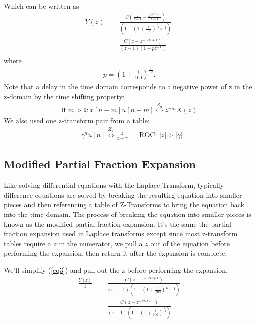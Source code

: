 \documentclass[letterpaper]{article}
\begin{document}
Which can be written as
\begin{align}
	Y(z) &=  \frac{C \left(\frac{z}{z-1} - \frac{z^{-12D+1}}{z-1} \right)}{\left(1 - \left(1 + \frac{i}{100} \right)^{\frac{1}{12}}z^{-1}\right)}. \label{eq3} \\
	     &=  \frac{C \left(z - z^{-12D+1} \right)}
	{\left(z-1\right)\left(1 - p z^{-1}\right)} \\
\end{align}
where 
\begin{align}
	p = \left(1 + \frac{i}{100} \right)^{\frac{1}{12}}.
\end{align}
Note that a delay in the time domain corresponds to a negative power of z in the z-domain by the time shifting property:
\begin{align}
	\text{If }m>0: x[n-m]u[n-m] \stackrel{Z_u}{\Longleftrightarrow} z^{-m} X(z)
\end{align}
We also used one z-transform pair from a table:
\begin{align}
	&\gamma^nu[n] \stackrel{Z_u}{\Longleftrightarrow} \frac{z}{z-\gamma} & &\text{ROC: } |z|>|\gamma|
\end{align}

\subsection{Modified Partial Fraction Expansion}
Like solving differential equations with the Laplace Transform, typically difference equations are solved by breaking the resulting equation into smaller pieces and then referencing a table of Z-Transforms to bring the equation back into the time domain. The process of breaking the equation into smaller pieces is known as the modified partial fraction expansion. It's the same the partial fraction expansion used in Laplace transforms except since most z-transform tables require a $z$ in the numerator, we pull a $z$ out of the equation before performing the expansion, then return it after the expansion is complete.

We'll simplify (\ref{eq3}) and pull out the z before performing the expansion.
\begin{align}
	\frac{Y(z)}{z} &=  \frac{C \left(z - z^{-12D+1} \right)}
	{z\left(z-1\right)\left(1 - \left(1 + \frac{i}{100} \right)^{\frac{1}{12}}z^{-1}\right)} \\
	&=  \frac{C \left(z - z^{-12D+1} \right)}
	{\left(z-1\right)\left(1 - \left(z + \frac{i}{100} \right)^{\frac{1}{12}}\right)} \\
\end{align}
\end{document}
